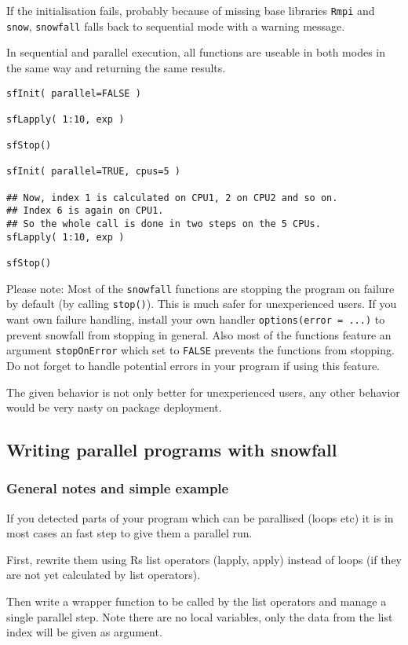 \documentclass[10pt,oneside]{article}
\begin{document}
If the initialisation fails, probably because of missing base libraries
\texttt{Rmpi} and \texttt{snow},
\texttt{snowfall} falls back to sequential mode with a warning message.

In sequential and parallel execution, 
all functions are useable in both modes in the same way and returning
the same results.

\begin{verbatim}
sfInit( parallel=FALSE )

sfLapply( 1:10, exp )

sfStop()

sfInit( parallel=TRUE, cpus=5 )

## Now, index 1 is calculated on CPU1, 2 on CPU2 and so on.
## Index 6 is again on CPU1.
## So the whole call is done in two steps on the 5 CPUs.
sfLapply( 1:10, exp )

sfStop()
\end{verbatim}

Please note: Most of the \texttt{snowfall} functions are stopping
the program on failure by default (by calling
\texttt{stop()}). This is much safer for unexperienced users. If you
want own failure handling, install your own handler
\texttt{options(error = ...)} to prevent snowfall from stopping in
general. Also most of the functions feature an argument \texttt{stopOnError}
which set to \texttt{FALSE} prevents the functions from stopping.
Do not forget to handle potential errors in your program if using this
feature.

The given behavior is not only better for unexperienced users, any other
behavior would be very nasty on package deployment.

\subsection{Writing parallel programs with snowfall}
\subsubsection{General notes and simple example}
If you detected parts of your program which can be parallised (loops
etc) it is in most cases an fast step to give them a parallel run.

First, rewrite them using Rs list operators (lapply, apply) instead of
loops (if they are not yet calculated by list operators).

Then write a wrapper function to be called by the list operators and
manage a single parallel step. Note there are no local variables, only
the data from the list index will be given as argument.
\end{document}
